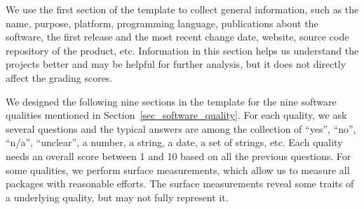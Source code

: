 \documentclass[preprint,12pt,authoryear]{elsarticle}
\begin{document}
We use the first section of the template to collect general information, such as
the name, purpose, platform, programming language, publications about the
software, the first release and the most recent change date, website, source
code repository of the product, etc. Information in this section helps us
understand the projects better and may be helpful for further analysis, but it
does not directly affect the grading scores.

We designed the following nine sections in the template for the nine software
qualities mentioned in Section~\ref{sec_software_quality}. For each quality, we
ask several questions and the typical answers are among the collection of
``yes'', ``no'', ``n/a'', ``unclear'', a number, a string, a date, a set of
strings, etc. Each quality needs an overall score between 1 and 10 based on all
the previous questions. For some qualities, we perform surface measurements,
which allow us to measure all packages with reasonable efforts. The surface
measurements reveal some traits of a underlying quality, but may not fully
represent it.
\end{document}
